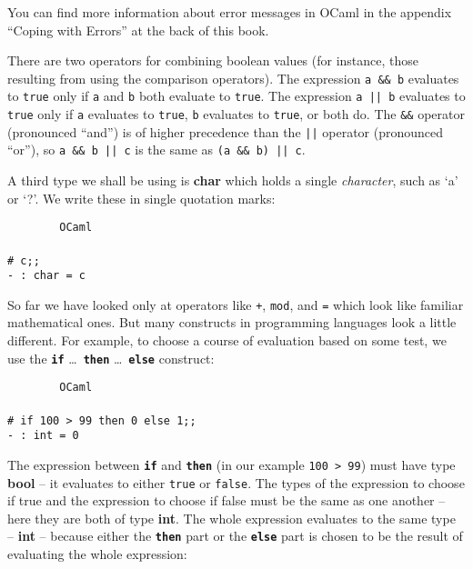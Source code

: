 \documentclass[]{book}
\newcommand\upquote[1]{\textquotesingle#1\textquotesingle}
\newcommand{\smspace}{\vspace{4mm}}
\begin{document}
\noindent You can find more information about error messages in OCaml in the appendix ``Coping with Errors'' at the back of this book.

\newcommand{\doublebar}{||}

There are two operators for combining boolean values (for instance, those resulting from using the comparison operators). The expression \texttt{a\! \&\&\! b} evaluates to \texttt{true} only if \texttt{a} and \texttt{b} both evaluate to \texttt{true}. The expression \index{\doublebar@\texttt{\doublebar}}\texttt{a\!\! ||\!\! b} evaluates to \texttt{true} only if \texttt{a} evaluates to \texttt{true}, \texttt{b} evaluates to \texttt{true}, or both do. The \texttt{\&\&} operator  (pronounced ``and'') is of higher precedence than the \texttt{||} operator (pronounced ``or''), so \texttt{a\! \&\&\! b\!\! ||\!\! c} is the same as \texttt{(a\! \&\&\! b)\!\! ||\!\! c}.

A third type we shall be using is \textbf{\textsf{char}} which holds a single \textit{character}, such as `a' or `?'. We write these in single quotation marks:

\smspace
\noindent\verb!        OCaml!\\
\noindent\\
\noindent\texttt{\# \upquote{c};;}\\
\noindent\texttt{- :\ char = \upquote{c}}
\smspace

\noindent So far we have looked only at operators like \texttt{+}, \texttt{mod}, and \texttt{=} which look like familiar mathematical ones. But many constructs in programming languages look a little different. For example, to choose a course of evaluation based on some test, we use the \texttt{\textbf{if}} \ldots\ \texttt{\textbf{then}} \ldots\  \texttt{\textbf{else}} construct:

\smspace
\noindent\verb!        OCaml!\\
\noindent\\
\noindent\texttt{\# if 100 > 99 then 0 else 1;;}\\
\noindent\texttt{- :\ int = 0} 
\smspace

\noindent The expression between \texttt{\textbf{if}} and \texttt{\textbf{then}} (in our example \texttt{100 > 99}) must have type \textbf{\textsf{bool}} -- it evaluates to either \texttt{true} or \texttt{false}. The types of the expression to choose if true and the expression to choose if false must be the same as one another -- here they are both of type \textbf{\textsf{int}}. The whole expression evaluates to the same type -- \textbf{\textsf{int}} -- because either the \texttt{\textbf{then}} part or the \texttt{\textbf{else}} part is chosen to be the result of evaluating the whole expression:
\end{document}
